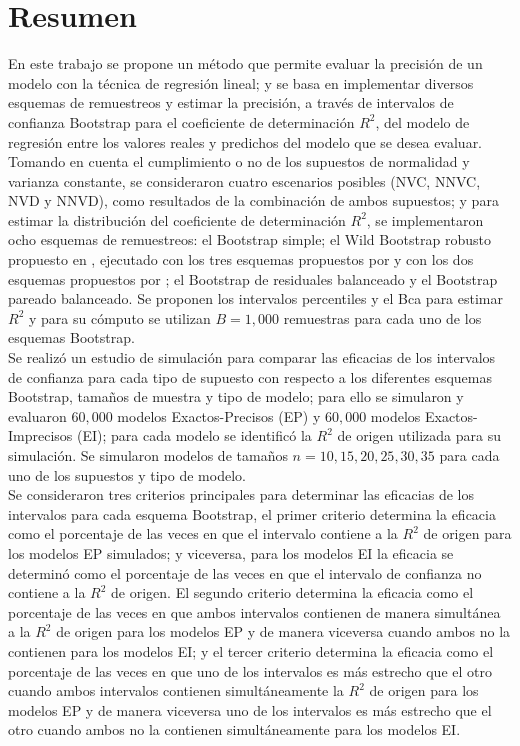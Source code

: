 \section*{Resumen}

En este trabajo se propone un método que permite evaluar la precisión de un modelo con la técnica de regresión lineal; y se basa en implementar diversos esquemas de remuestreos y estimar la precisión, a través de intervalos de confianza Bootstrap para el coeficiente de determinación $R^2$, del modelo de regresión entre los valores reales y predichos del modelo que se desea evaluar.\\

Tomando en cuenta el cumplimiento o no de los supuestos de normalidad y varianza constante, se consideraron cuatro escenarios posibles (NVC, NNVC, NVD y NNVD), como resultados de la combinación de ambos supuestos; y para estimar la distribución del coeficiente de determinación $R^2$, se implementaron ocho esquemas de remuestreos: el Bootstrap simple; el Wild Bootstrap robusto propuesto en \textcite{rana-2012}, ejecutado con los tres esquemas propuestos por \textcite{wu-1986} y con los dos esquemas propuestos por \textcite{liu-1988}; el Bootstrap de residuales balanceado y el Bootstrap pareado balanceado. Se proponen los intervalos percentiles y el Bca para estimar $R^2$ y para su cómputo se utilizan $B=1,000$ remuestras para cada uno de los esquemas Bootstrap.\\ 

Se realizó un estudio de simulación para comparar las eficacias de los intervalos de confianza para cada tipo de supuesto con respecto a los diferentes esquemas Bootstrap, tamaños de muestra y tipo de modelo; para ello se simularon y evaluaron $60,000$ modelos Exactos-Precisos (EP) y $60,000$ modelos Exactos-Imprecisos (EI); para cada modelo se identificó la $R^2$ de origen utilizada para su simulación. Se simularon modelos de tamaños $n=10, 15, 20, 25, 30, 35$ para cada uno de los supuestos y tipo de modelo.\\

Se consideraron tres criterios principales para determinar las eficacias de los intervalos para cada esquema Bootstrap, el primer criterio determina la eficacia como el porcentaje de las veces en que el intervalo contiene a la $R^2$ de origen para los modelos EP simulados; y viceversa, para los modelos EI la eficacia se determinó como el porcentaje de las veces en que el intervalo de confianza no contiene a la $R^2$ de origen. El segundo criterio determina la eficacia como el porcentaje de las veces en que ambos intervalos contienen de manera simultánea a la $R^2$ de origen para los modelos EP y de manera viceversa cuando ambos no la contienen para los modelos EI; y el tercer criterio determina la eficacia como el porcentaje de las veces en que uno de los intervalos es más estrecho que el otro cuando ambos intervalos contienen simultáneamente la $R^2$ de origen para los modelos EP y de manera viceversa uno de los intervalos es más estrecho que el otro cuando ambos no la contienen simultáneamente para los modelos EI.\\

